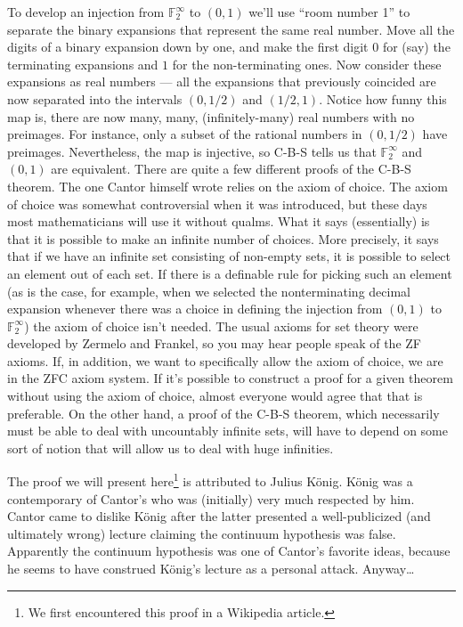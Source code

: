 To develop an injection from ${\mathbb F}_2^\infty$ to $(0, 1)$ we'll use ``room number 1'' to
separate the binary expansions that represent the same real number.  Move
all the digits of a binary expansion down by one, and make the first digit
$0$ for (say) the terminating expansions and $1$ for the non-terminating ones.
Now consider these expansions as real numbers --- all the expansions that
previously coincided are now separated into the intervals $(0, 1/2)$ and 
$(1/2, 1)$.  Notice how funny this map is, there are now 
many, many, (infinitely-many) 
real numbers with no preimages.  For instance, only a subset of the rational
numbers in $(0, 1/2)$ have preimages.  Nevertheless, the map is injective, so
C-B-S tells us that ${\mathbb F}_2^\infty$ and $(0, 1)$ are equivalent.
There are quite a few different proofs of the C-B-S theorem.  The one
Cantor himself wrote relies on the axiom of choice.  The axiom of choice
was somewhat controversial when it was introduced, but these days most
mathematicians will use it without qualms.  What it says (essentially) is that
it is possible to make an infinite number of choices.  More precisely, it says
that if we have an infinite set consisting of non-empty sets, it is possible
to select an element out of each set.  If there is a definable rule for picking
such an element (as is the case, for example, when we selected the 
nonterminating decimal expansion whenever there was a choice in defining the
injection from $(0, 1)$ to ${\mathbb F}_2^\infty$) the axiom of choice 
isn't needed.   The usual
axioms for set theory were developed by Zermelo and Frankel, so you may
hear people speak of the ZF axioms.  If, in addition, we want to specifically
allow the axiom of choice, we are in the ZFC axiom system.  If it's possible
to construct a proof for a given theorem without using the axiom of choice,
almost everyone would agree that that is preferable.  On the other hand,
a proof of the C-B-S theorem, which necessarily must be able to deal with
uncountably infinite sets, will have to depend on some sort of notion that
will allow us to deal with huge infinities.

The proof we will present here\footnote{We first encountered this proof 
in a Wikipedia article\cite{wiki-CBS}.} is attributed to Julius K\"{o}nig.  
K\"{o}nig was a contemporary of Cantor's who was (initially) very 
much respected by him.  Cantor came to dislike K\"{o}nig after the 
latter presented a well-publicized (and ultimately wrong) lecture 
claiming the continuum hypothesis was false.
Apparently the continuum hypothesis was one of Cantor's favorite ideas,
because he seems to have construed K\"{o}nig's lecture as a personal attack.
Anyway\ldots 

